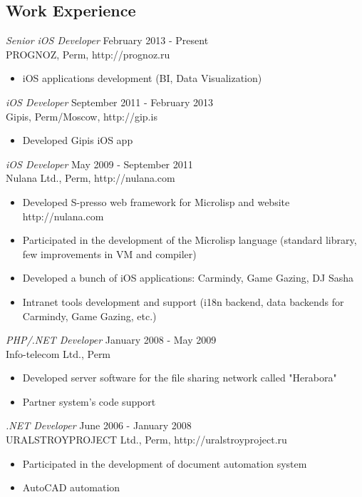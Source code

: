 \documentclass[12pt]{res}
\begin{document}
\begin{resume}
\section{Work Experience}

{\sl Senior iOS Developer} \hfill February 2013 - Present \\
PROGNOZ, Perm, http://prognoz.ru 
\begin{itemize} 
\item iOS applications development (BI, Data Visualization)
\end{itemize}

{\sl iOS Developer} \hfill September 2011 - February 2013 \\
Gipis, Perm/Moscow, http://gip.is 
\begin{itemize} 
\item Developed Gipis iOS app
\end{itemize}

{\sl iOS Developer} \hfill May 2009 - September 2011 \\
Nulana Ltd., Perm, http://nulana.com
\begin{itemize} 
\item Developed S-presso web framework for Microlisp and website http://nulana.com
\item Participated in the development of the Microlisp language (standard library, few improvements in VM and compiler)
\item Developed a bunch of iOS applications: Carmindy, Game Gazing, DJ Sasha
\item Intranet tools development and support (i18n backend, data backends for Carmindy, Game Gazing, etc.)
\end{itemize}
{\sl PHP/.NET Developer} \hfill January 2008 - May 2009 \\
Info-telecom Ltd., Perm
\begin{itemize}
\item Developed server software for the file sharing network called "Herabora"
\item Partner system's code support
\end{itemize} 

{\sl .NET Developer} \hfill June 2006 - January 2008 \\
URALSTROYPROJECT Ltd., Perm, http://uralstroyproject.ru
\begin{itemize}
\item Participated in the development of document automation system
\item AutoCAD automation
\end{itemize} 


\end{resume}
\end{document}
